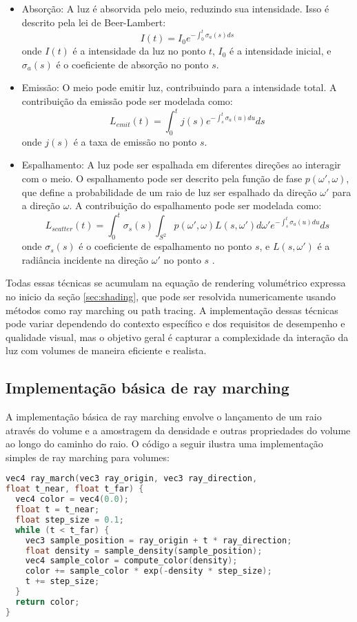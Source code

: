 \begin{itemize}
  \item Absorção: A luz é absorvida pelo meio, reduzindo sua intensidade. Isso é descrito pela lei de Beer-Lambert:
  $$
  I(t) = I_0 e^{-\int_{0}^{t} \sigma_a(s) ds}
  $$
  onde $I(t)$ é a intensidade da luz no ponto $t$, $I_0$ é a intensidade inicial, e $\sigma_a(s)$ é o coeficiente de absorção no ponto $s$.
  
  \item Emissão: O meio pode emitir luz, contribuindo para a intensidade total. A contribuição da emissão pode ser modelada como:
  $$
  L_{emit}(t) = \int_{0}^{t} j(s) e^{-\int_{s}^{t} \sigma_a(u) du} ds
  $$
  onde $j(s)$ é a taxa de emissão no ponto $s$.
  
  \item Espalhamento: A luz pode ser espalhada em diferentes direções ao interagir com o meio. O espalhamento pode ser descrito pela função de fase $p(\omega', \omega)$, que define a probabilidade de um raio de luz ser espalhado da direção $\omega'$ para a direção $\omega$. A contribuição do espalhamento pode ser modelada como:
  $$
  L_{scatter}(t) = \int_{0}^{t} \sigma_s(s) \int_{S^2} p(\omega', \omega) L(s, \omega') d\omega' e^{-\int_{s}^{t} \sigma_a(u) du} ds
  $$
  onde $\sigma_s(s)$ é o coeficiente de espalhamento no ponto $s$, e $L(s, \omega')$ é a radiância incidente na direção $\omega'$ no ponto $s$ \cite{Kajiya1984}.
\end{itemize}

Todas essas técnicas se acumulam na equação de rendering volumétrico expressa no inicio da seção \ref{sec:shading}, que pode ser resolvida numericamente usando métodos como ray marching ou path tracing. A implementação dessas técnicas pode variar dependendo do contexto específico e dos requisitos de desempenho e qualidade visual, mas o objetivo geral é capturar a complexidade da interação da luz com volumes de maneira eficiente e realista.

\subsection{Implementação básica de ray marching}
A implementação básica de ray marching envolve o lançamento de um raio através do volume e a amostragem da densidade e outras propriedades do volume ao longo do caminho do raio. O código a seguir ilustra uma implementação simples de ray marching para volumes:

\begin{lstlisting}[language=C]
vec4 ray_march(vec3 ray_origin, vec3 ray_direction,
float t_near, float t_far) {
  vec4 color = vec4(0.0);
  float t = t_near;
  float step_size = 0.1;
  while (t < t_far) {
    vec3 sample_position = ray_origin + t * ray_direction;
    float density = sample_density(sample_position);
    vec4 sample_color = compute_color(density);
    color += sample_color * exp(-density * step_size);
    t += step_size;
  }
  return color;
}
\end{lstlisting}


